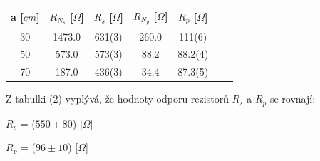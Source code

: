 \documentclass[a4paper,11pt]{article}
\begin{document}
    \begin{minipage}[t]{0.5\textwidth}
    \vspace{-138pt}
        \begin{tabular}{|c|c|c|c|c|c|c|}
                    \hline
                    a [$cm$] & $R_{N_s}$ [$\Omega$] & $R_s$ [$\Omega$] & $R_{N_p}$ [$\Omega$] & $R_p$ [$\Omega$] \\
                    \hline
                    30 & 1473.0 & 631(3) & 260.0 & 111(6)\\
                    \hline
                    50 & 573.0 & 573(3) & 88.2 & 88.2(4)\\
                    \hline
                    70 & 187.0 & 436(3) & 34.4 & 87.3(5)\\
                    \hline
                \end{tabular}
                \captionsetup{justification=centering, font=footnotesize}
                \vspace{10pt}
                \raggedright
                \par Z tabulki (2) vyplývá, že hodnoty odporu rezistorů $R_s$ a $R_p$ se rovnají:
                \begin{center}
                    $R_s$ = ($550 \pm 80$) [$\Omega$]
                    \par $R_p$ = ($96 \pm 10$) [$\Omega$]
                \end{center}

\end{minipage}
\end{document}
